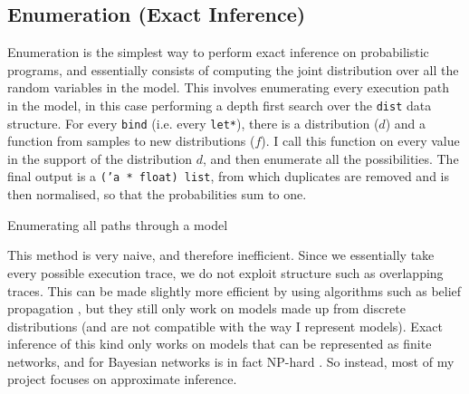 					
					
					
					
\subsection{Enumeration (Exact Inference)} \label{sec:enum}
Enumeration is the simplest way to perform exact inference on probabilistic programs, and essentially consists of computing the joint distribution over all the random variables in the model. This involves enumerating every execution path in the model, in this case performing a depth first search over the \texttt{dist} data structure. For every \texttt{bind} (i.e. every \texttt{let*}), there is a distribution ($d$) and a function from samples to new distributions ($f$). I call this function on every value in the support of the distribution $d$, and then enumerate all the possibilities. The final output is a \texttt{('a * float) list}, from which duplicates are removed and is then normalised, so that the probabilities sum to one.
					
\begin{listing}[ht]
	\caption{Enumerating all paths through a model}
	\label{lst:enum}
\end{listing}
					
This method is very naive, and therefore inefficient. Since we essentially take every possible execution trace, we do not exploit structure such as overlapping traces. This can be made slightly more efficient by using algorithms such as belief propagation \cite{belief-prop}, but they still only work on models made up from discrete distributions (and are not compatible with the way I represent models). Exact inference of this kind only works on models that can be represented as finite networks, and for Bayesian networks is in fact NP-hard \cite{cooper1990computational}. So instead, most of my project focuses on approximate inference.
					
